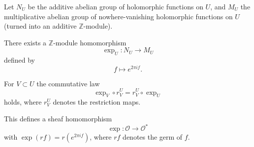 Let $N_U$ be the additive abelian group of holomorphic functions on $U$,
and $M_U$ the multiplicative abelian group of nowhere-vanishing holomorphic
functions on $U$ (turned into an additive $\mathbb{Z}$-module).

There exists a $\mathbb{Z}$-module homomorphism
$$\exp_U: N_U \rightarrow M_U$$
defined by
$$f \mapsto e^{2\pi i f}.$$

For $V \subset U$ the commutative law
$$\exp_V \circ r_V^U = r_V^U \circ \exp_U$$
holds, where $r_V^U$ denotes the restriction maps.

This defines a sheaf homomorphism
$$\exp: \mathcal{O} \rightarrow \mathcal{O}^*$$
with $\exp(rf) = r(e^{2\pi i f})$, where $rf$ denotes the germ of $f$.
